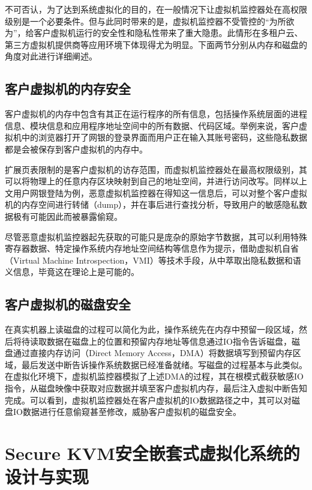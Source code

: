 不可否认，为了达到系统虚拟化的目的，在一般情况下让虚拟机监控器处在高权限级别是一个必要条件。但与此同时带来的是，虚拟机监控器不受管控的“为所欲为”，给客户虚拟机运行的安全性和隐私性带来了重大隐患。此情形在多租户云、第三方虚拟机提供商等应用环境下体现得尤为明显。下面两节分别从内存和磁盘的角度对此进行详细阐述。

\subsection{客户虚拟机的内存安全}

客户虚拟机的内存中包含有其正在运行程序的所有信息，包括操作系统层面的进程信息、模块信息和应用程序地址空间中的所有数据、代码区域。举例来说，客户虚拟机中的浏览器打开了网银的登录界面而用户正在输入其账号密码，这些隐私数据都是会被保存到客户虚拟机的内存中。

扩展页表限制的是客户虚拟机的访存范围，而虚拟机监控器处在最高权限级别，其可以将物理上的任意内存区块映射到自己的地址空间，并进行访问改写。同样以上文用户网银登陆为例，恶意虚拟机监控器在得知这一信息后，可以对整个客户虚拟机的内存空间进行转储（dump），并在事后进行查找分析，导致用户的敏感隐私数据极有可能因此而被暴露偷窥。

尽管恶意虚拟机监控器起先获取的可能只是庞杂的原始字节数据，其可以利用特殊寄存器数据、特定操作系统内存地址空间结构等信息作为提示，借助虚拟机自省（Virtual Machine Introspection，VMI）等技术手段，从中萃取出隐私数据和语义信息，毕竟这在理论上是可能的。

\subsection{客户虚拟机的磁盘安全}

在真实机器上读磁盘的过程可以简化为此，操作系统先在内存中预留一段区域，然后将待读取数据在磁盘上的位置和预留内存地址等信息通过IO指令告诉磁盘，磁盘通过直接内存访问（Direct Memory Access，DMA）将数据填写到预留内存区域，最后发送中断告诉操作系统数据已经准备就绪。写磁盘的过程基本与此类似。在虚拟化环境下，虚拟机监控器模拟了上述DMA的过程，其在根模式截获敏感IO指令，从磁盘映像中获取对应数据并填至客户虚拟机内存，最后注入虚拟中断告知完成。可以看到，虚拟机监控器处在客户虚拟机的IO数据路径之中，其可以对磁盘IO数据进行任意偷窥甚至修改，威胁客户虚拟机的磁盘安全。

\section{Secure KVM安全嵌套式虚拟化系统的设计与实现}

